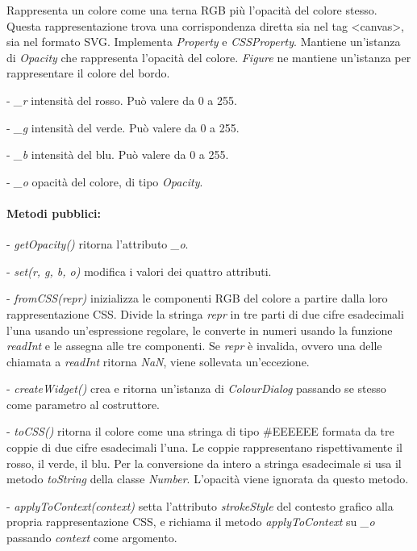 Rappresenta un colore come una terna RGB pi\`u l'opacit\`a del colore stesso. Questa rappresentazione trova una corrispondenza diretta sia nel tag <canvas>, sia nel formato SVG.
Implementa \textit{Property} e \textit{CSSProperty}. Mantiene un'istanza di \textit{Opacity} che rappresenta l'opacit\`a del colore.
\textit{Figure} ne mantiene un'istanza per rappresentare il colore del bordo.
\begin{elencopuntato}[\subsubsecindent]
\item[-] \textit{\_r} intensit\`a del rosso. Pu\`o valere da 0 a 255.
\item[-] \textit{\_g} intensit\`a del verde. Pu\`o valere da 0 a 255.
\item[-] \textit{\_b} intensit\`a del blu. Pu\`o valere da 0 a 255.
\item[-] \textit{\_o} opacit\`a del colore, di tipo \textit{Opacity}.
\end{elencopuntato}
\paragraph{Metodi pubblici:}
\begin{elencopuntato}[\subsubsecindent]
\item[-] \textit{getOpacity()} ritorna l'attributo \textit{{\_}o}.
\item[-] \textit{set(r, g, b, o)} modifica i valori dei quattro attributi.
\item[-] \textit{fromCSS(repr)} inizializza le componenti RGB del colore a partire dalla loro rappresentazione CSS. Divide la stringa \textit{repr} in tre parti di due cifre esadecimali l'una usando un'espressione regolare, le converte in numeri usando la funzione \textit{readInt} e le assegna alle tre componenti. Se \textit{repr} \`e invalida, ovvero una delle chiamata a \textit{readInt} ritorna \textit{NaN}, viene sollevata un'eccezione.
\item[-] \textit{createWidget()} crea e ritorna un'istanza di \textit{ColourDialog} passando se stesso come parametro al costruttore.
\item[-] \textit{toCSS()} ritorna il colore come una stringa di tipo {\#}EEEEEE formata da tre coppie di due cifre esadecimali l'una. Le coppie rappresentano rispettivamente il rosso, il verde, il blu. Per la conversione da intero a stringa esadecimale si usa il metodo \textit{toString} della classe \textit{Number}. L'opacit\`a viene ignorata da questo metodo.
\item[-] \textit{applyToContext(context)} setta l'attributo \textit{strokeStyle} del contesto grafico alla propria rappresentazione CSS, e richiama il metodo \textit{applyToContext} su \textit{{\_}o} passando \textit{context} come argomento.
\end{elencopuntato}

